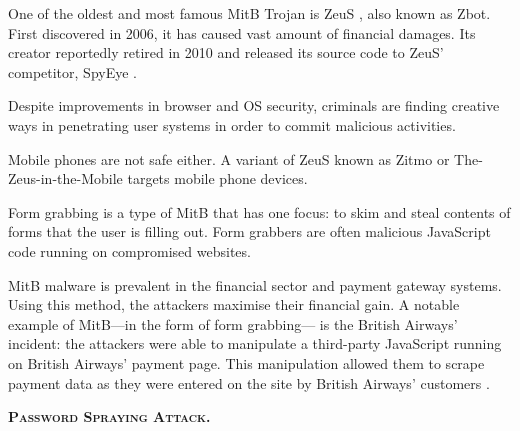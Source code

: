 One of the oldest and most famous MitB Trojan is ZeuS \cite{noauthor_zeus_2010}, also known as Zbot. First discovered in 2006, it has caused vast amount of financial damages. Its creator reportedly retired in 2010 and released \cite{noauthor_zeus_2011} its source code to ZeuS' competitor, SpyEye \cite{noauthor_trojan.spyeye_nodate}.

Despite improvements in browser and OS security, criminals are finding
creative ways in penetrating user systems in order to commit malicious
activities.

Mobile phones are not safe either. A variant of ZeuS known as Zitmo \cite{etaher_zeus_2015} or The-Zeus-in-the-Mobile targets mobile phone
devices.

Form grabbing is a type of MitB that has one focus: to skim and steal
contents of forms that the user is filling out. Form grabbers are often
malicious JavaScript code running on compromised websites.

MitB malware is prevalent in the financial sector and payment gateway
systems. Using this method, the attackers maximise their financial gain.
A notable example of MitB---in the form of form grabbing--- is the
British Airways' incident: the attackers were able to manipulate a
third-party JavaScript running on British Airways' payment page. This
manipulation allowed them to scrape payment data as they were entered on
the site by British Airways' customers \cite{klijnsma_british_2018}.

\textbf{\textsc{Password Spraying Attack.}}


